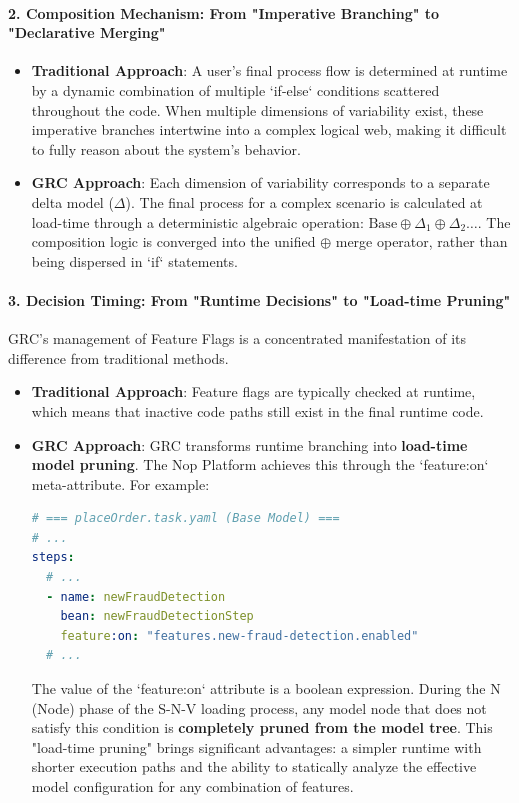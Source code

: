 \documentclass[11pt]{article}
\begin{document}
\paragraph{2. Composition Mechanism: From "Imperative Branching" to "Declarative Merging"}
\begin{itemize}
    \item \textbf{Traditional Approach}: A user's final process flow is determined at runtime by a dynamic combination of multiple `if-else` conditions scattered throughout the code. When multiple dimensions of variability exist, these imperative branches intertwine into a complex logical web, making it difficult to fully reason about the system's behavior.
    \item \textbf{GRC Approach}: Each dimension of variability corresponds to a separate delta model ($\Delta$). The final process for a complex scenario is calculated at load-time through a deterministic algebraic operation: $\text{Base} \oplus \Delta_1 \oplus \Delta_2 \dots$. The composition logic is converged into the unified $\oplus$ merge operator, rather than being dispersed in `if` statements.
\end{itemize}

\paragraph{3. Decision Timing: From "Runtime Decisions" to "Load-time Pruning"}
GRC's management of Feature Flags is a concentrated manifestation of its difference from traditional methods.
\begin{itemize}
    \item \textbf{Traditional Approach}: Feature flags are typically checked at runtime, which means that inactive code paths still exist in the final runtime code.
    \item \textbf{GRC Approach}: GRC transforms runtime branching into \textbf{load-time model pruning}. The Nop Platform achieves this through the `feature:on` meta-attribute. For example:
    \begin{lstlisting}[language=YAML, caption={Declarative Feature Toggle in a GRC Model}]
# === placeOrder.task.yaml (Base Model) ===
# ...
steps:
  # ...
  - name: newFraudDetection
    bean: newFraudDetectionStep
    feature:on: "features.new-fraud-detection.enabled"
  # ...
    \end{lstlisting}
    The value of the `feature:on` attribute is a boolean expression. During the N (Node) phase of the S-N-V loading process, any model node that does not satisfy this condition is \textbf{completely pruned from the model tree}. This "load-time pruning" brings significant advantages: a simpler runtime with shorter execution paths and the ability to statically analyze the effective model configuration for any combination of features.
\end{itemize}
\end{document}

